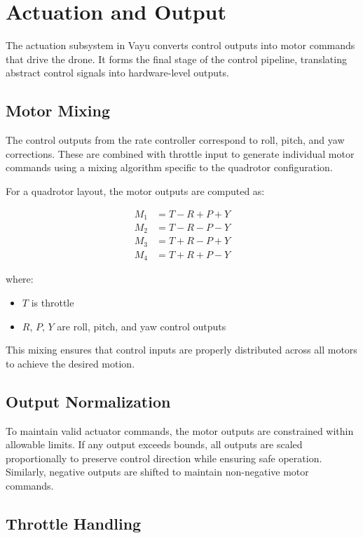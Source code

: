 \section{Actuation and Output}
\label{sec:vayu_actuation}

The actuation subsystem in Vayu converts control outputs into motor commands that drive the drone. It forms the final stage of the control pipeline, translating abstract control signals into hardware-level outputs.

\subsection{Motor Mixing}

The control outputs from the rate controller correspond to roll, pitch, and yaw corrections. These are combined with throttle input to generate individual motor commands using a mixing algorithm specific to the quadrotor configuration.

For a quadrotor layout, the motor outputs are computed as:

\[
\begin{aligned}
M_1 &= T - R + P + Y \\
M_2 &= T - R - P - Y \\
M_3 &= T + R - P + Y \\
M_4 &= T + R + P - Y
\end{aligned}
\]

where:
\begin{itemize}
    \item $T$ is throttle
    \item $R$, $P$, $Y$ are roll, pitch, and yaw control outputs
\end{itemize}

This mixing ensures that control inputs are properly distributed across all motors to achieve the desired motion.

\subsection{Output Normalization}

To maintain valid actuator commands, the motor outputs are constrained within allowable limits. If any output exceeds bounds, all outputs are scaled proportionally to preserve control direction while ensuring safe operation. Similarly, negative outputs are shifted to maintain non-negative motor commands.

\subsection{Throttle Handling}

